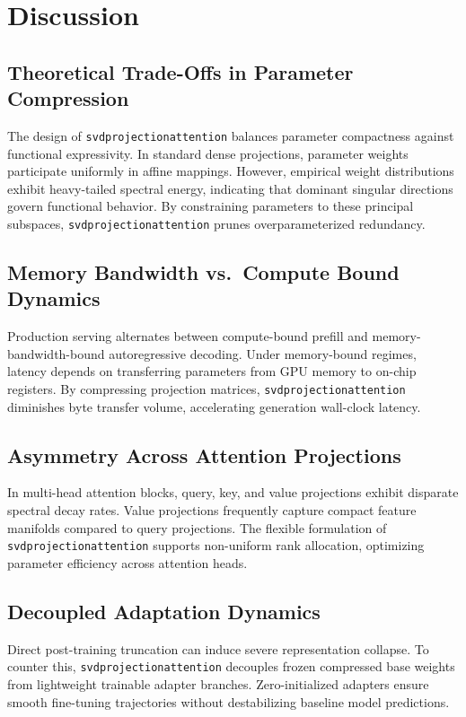 \section{Discussion}

\subsection{Theoretical Trade-Offs in Parameter Compression}
The design of \texttt{svdprojectionattention} balances parameter compactness against functional expressivity. In standard dense projections, parameter weights participate uniformly in affine mappings. However, empirical weight distributions exhibit heavy-tailed spectral energy, indicating that dominant singular directions govern functional behavior. By constraining parameters to these principal subspaces, \texttt{svdprojectionattention} prunes overparameterized redundancy.

\subsection{Memory Bandwidth vs.\ Compute Bound Dynamics}
Production serving alternates between compute-bound prefill and memory-bandwidth-bound autoregressive decoding. Under memory-bound regimes, latency depends on transferring parameters from GPU memory to on-chip registers. By compressing projection matrices, \texttt{svdprojectionattention} diminishes byte transfer volume, accelerating generation wall-clock latency.

\subsection{Asymmetry Across Attention Projections}
In multi-head attention blocks, query, key, and value projections exhibit disparate spectral decay rates. Value projections frequently capture compact feature manifolds compared to query projections. The flexible formulation of \texttt{svdprojectionattention} supports non-uniform rank allocation, optimizing parameter efficiency across attention heads.

\subsection{Decoupled Adaptation Dynamics}
Direct post-training truncation can induce severe representation collapse. To counter this, \texttt{svdprojectionattention} decouples frozen compressed base weights from lightweight trainable adapter branches. Zero-initialized adapters ensure smooth fine-tuning trajectories without destabilizing baseline model predictions.

